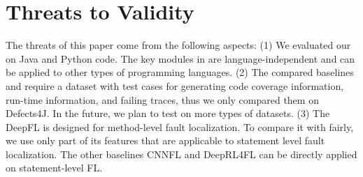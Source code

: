 \section{Threats to Validity}
The threats of this paper come from the following aspects: (1) We
evaluated our {\tool} on Java and Python code. The key modules in
{\tool} are language-independent and can be applied to other types of
programming languages.  (2) The compared baselines and {\tool} require
a dataset with test cases for generating code coverage information,
run-time information, and failing traces, thus we only compared them
on Defects4J. In the future, we plan to test {\tool} on more types of
datasets.  (3) The DeepFL is designed for method-level fault
localization. To compare it with {\tool} fairly, we use only part of
its features that are applicable to statement level fault
localization.  The other baselines CNNFL and DeepRL4FL can be
directly applied on statement-level FL.

